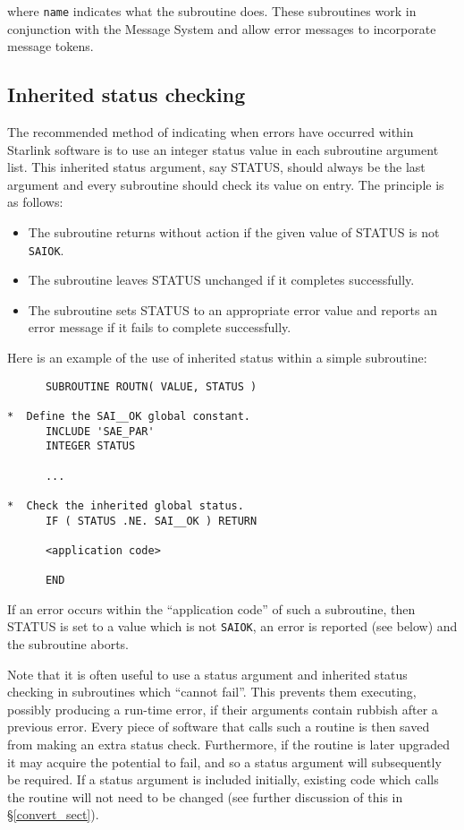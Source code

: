 \documentclass[twoside,11pt]{article}
\newcommand{\htmlref}[2]{#1}
\newcommand{\latex}[1]{#1}
\newcommand{\xlabel}[1]{}
\renewcommand{\_}{\texttt{\symbol{95}}}
\newcommand{\const}[1]{\texttt{#1}}
\newcommand{\saiok}{\const{SAI\_\_OK}}
\begin{document}
where \texttt{name} indicates what the subroutine does.
These subroutines work in conjunction with the Message System and allow error
messages to incorporate message tokens. 


\subsection{\xlabel{inherited_status_checking}Inherited status checking
\label{inherited_status} \xlabel{inherited_status}} 
The recommended method of indicating when errors have occurred within
Starlink software is to use an integer status value in each subroutine
argument list. 
This inherited status argument, say STATUS, should always be the last
argument and every subroutine should check its value on entry. 
The principle is as follows:

\begin {itemize}
\item The subroutine returns without action if the given value of STATUS is 
not \saiok. 

\item The subroutine leaves STATUS unchanged if it completes successfully.

\item The subroutine sets STATUS to an appropriate error value and reports an
error message if it fails to complete successfully. 
\end {itemize}

Here is an example of the use of inherited status within a simple subroutine:

\begin {small}
\begin{verbatim}
      SUBROUTINE ROUTN( VALUE, STATUS )
      
*  Define the SAI__OK global constant.
      INCLUDE 'SAE_PAR'
      INTEGER STATUS

      ...

*  Check the inherited global status.
      IF ( STATUS .NE. SAI__OK ) RETURN

      <application code>

      END
\end{verbatim}
\end {small}

If an error occurs within the ``application code'' of such a subroutine, then
STATUS is set to a value which is not \saiok, an error is reported (see
below) and the subroutine aborts. 

Note that it is often useful to use a status argument and inherited status
checking in subroutines which ``cannot fail''. 
This prevents them executing, possibly producing a run-time error, if
their arguments contain rubbish after a previous error.
Every piece of software that calls such a routine is then saved from making
an extra status check. 
Furthermore, if the routine is later upgraded it may acquire the potential
to fail, and so a status argument will subsequently be required.
If a status argument is included initially, existing code which calls 
the routine will not need to be changed (see 
\htmlref{further discussion}{convert_sect}
of this\latex{ in \S\ref{convert_sect}}).
\end{document}
